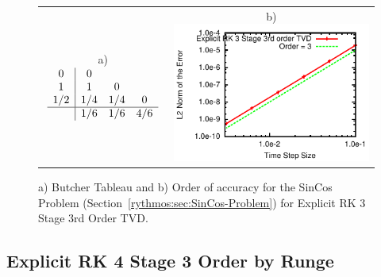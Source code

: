 \begin{figure}[H]
\centering{}%
\begin{tabular}{cc}
a)$\begin{array}{c|ccc}
0 & 0\\
1 & 1 & 0\\
1/2 & 1/4 & 1/4 & 0\\
\hline  & 1/6 & 1/6 & 4/6
\end{array}$ & b)\includegraphics[scale=1.5]{figures/ERK_3Stage3OrderTVD}\tabularnewline
\end{tabular}\caption{a) Butcher Tableau and b) Order of accuracy for the SinCos Problem
(Section~\ref{rythmos:sec:SinCos-Problem}) for Explicit RK 3 Stage
3rd Order TVD.\label{rythmos:tab:ButcherTableau-ERK_3Stage3OrderTVD}}
\end{figure}



\subsection{Explicit RK 4 Stage 3 Order by Runge}

